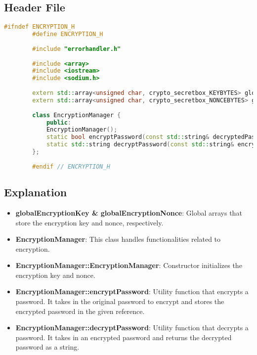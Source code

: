 \documentclass{article}
\begin{document}
	\subsection*{Header File}
	\begin{mdframed}[backgroundcolor=background, hidealllines=false, innerleftmargin=15pt, innerrightmargin=5pt, innertopmargin=0pt, innerbottommargin=-5pt]
	\begin{lstlisting}[language=C++]
		#ifndef ENCRYPTION_H
		#define ENCRYPTION_H
		
		#include "errorhandler.h"
		
		#include <array>
		#include <iostream>
		#include <sodium.h>
		
		extern std::array<unsigned char, crypto_secretbox_KEYBYTES> globalEncryptionKey;
		extern std::array<unsigned char, crypto_secretbox_NONCEBYTES> globalEncryptionNonce;
		
		class EncryptionManager {
			public:
			EncryptionManager();
			static bool encryptPassword(const std::string& decryptedPassword, std::string& encryptedPassword);
			static std::string decryptPassword(const std::string& encryptedPassword);
		};
		
		#endif // ENCRYPTION_H
	\end{lstlisting}
	\end{mdframed}
	
	\subsection*{Explanation}
	\begin{itemize}
		\item \textbf{globalEncryptionKey \& globalEncryptionNonce}: Global arrays that store the encryption key and nonce, respectively.
		\item \textbf{EncryptionManager}: This class handles functionalities related to encryption.
		\item \textbf{EncryptionManager::EncryptionManager}: Constructor initializes the encryption key and nonce.
		\item \textbf{EncryptionManager::encryptPassword}: Utility function that encrypts a password. It takes in the original password to encrypt and stores the encrypted password in the given reference.
		\item \textbf{EncryptionManager::decryptPassword}: Utility function that decrypts a password. It takes in an encrypted password and returns the decrypted password as a string.
	\end{itemize}
	
\end{document}
